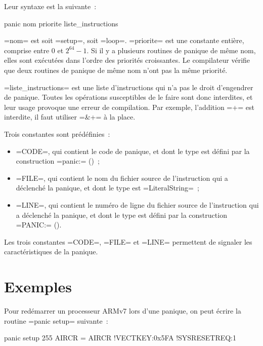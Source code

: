 Leur syntaxe est la suivante~:
\begin{OMNIBUS}
panic nom priorite {
  liste_instructions
}
\end{OMNIBUS}

\omnibus=nom= est soit \omnibus=setup=, soit \omnibus=loop=. \omnibus=priorite= est une constante entière, comprise entre $0$ et $2^{64}-1$. Si il y a plusieurs routines de panique de même nom, elles sont exécutées dans l'ordre des priorités croissantes. Le compilateur vérifie que deux routines de panique de même nom n'ont pas la même priorité.

\omnibus=liste_instructions= est une liste d'instructions qui n'a pas le droit d'engendrer de panique. Toutes les opérations susceptibles de le faire sont donc interdites, et leur usage provoque une erreur de compilation. Par exemple, l'addition \omnibus=+= est interdite, il faut utiliser \omnibus=&+= à la place.

Trois constantes sont prédéfinies~:
\begin{itemize}
  \item \omnibus=CODE=, qui contient le code de panique, et dont le type est défini par la construction \omnibus=panic:= ()~;
  \item \omnibus=FILE=, qui contient le nom du fichier source de l'instruction qui a déclenché la panique, et dont le type est \omnibus=LiteralString=~;
  \item \omnibus=LINE=, qui contient le numéro de ligne du fichier source de l'instruction qui a déclenché la panique, et dont le type est défini par la construction \omnibus=PANIC:= ().
\end{itemize}

Les trois constantes \omnibus=CODE=, \omnibus=FILE= et \omnibus=LINE= permettent de signaler les caractéristiques de la panique.


\section{Exemples}

Pour redémarrer un processeur ARMv7 lors d'une panique, on peut écrire la routine \omnibus=panic setup= suivante~:
\begin{OMNIBUS}
panic setup 255 {
  AIRCR = {AIRCR !VECTKEY:0x5FA !SYSRESETREQ:1}
}
\end{OMNIBUS}
